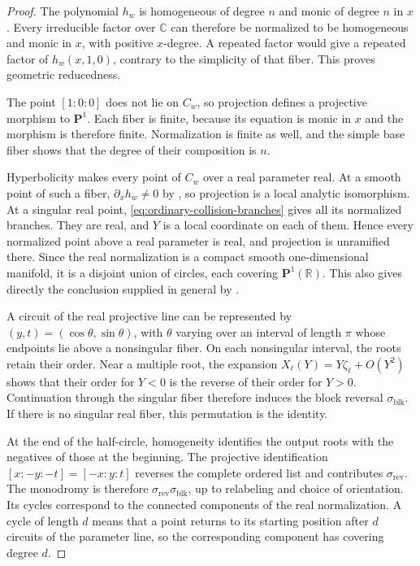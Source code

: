 \documentclass[12pt,reqno]{amsart}
\theoremstyle{definition}
\theoremstyle{remark}
\newcommand{\R}{\mathbb R}
\newcommand{\C}{\mathbb C}
\begin{document}
\begin{proof}
The polynomial \(h_w\) is homogeneous of degree \(n\) and monic of
degree \(n\) in \(x\).  Every irreducible factor over \(\C\) can
therefore be normalized to be homogeneous and monic in \(x\), with
positive \(x\)-degree.  A repeated factor would give a repeated factor
of \(h_w(x,1,0)\), contrary to the simplicity of that fiber.  This
proves geometric reducedness.

The point \([1:0:0]\) does not lie on \(C_w\), so projection defines a projective morphism to \(\mathbf P^1\).  Each fiber is finite, because its equation is monic in \(x\) and the morphism is therefore finite. Normalization is finite as well, and the simple base fiber
shows that the degree of their composition is \(n\).

Hyperbolicity makes every point of \(C_w\) over a real parameter
real.  At a smooth point of such a fiber, \(\partial_xh_w\ne0\) by
,
so projection is a local analytic isomorphism.  At a singular real
point, \eqref{eq:ordinary-collision-branches} gives all its normalized
branches.  They are real, and \(Y\) is a local coordinate on each of
them.  Hence every normalized point above a real parameter is real,
and projection is unramified there.  Since the real normalization is
a compact smooth one-dimensional manifold, it is a disjoint union of
circles, each covering \(\mathbf P^1(\R)\).  This also gives directly
the conclusion supplied in general by \cite[Theorem~2.19]{KummerShamovich20}.

A circuit of the real projective line can be represented by \((y,t)=(\cos\theta,\sin\theta)\), with \(\theta\) varying over an interval of length \(\pi\) whose endpoints lie above a nonsingular fiber. On each nonsingular interval, the roots retain their order. Near a multiple root, the expansion
\(X_\ell(Y)=Y\zeta_\ell+O(Y^2)\) shows that their order for \(Y<0\)
is the reverse of their order for \(Y>0\). Continuation through the singular fiber therefore induces the block reversal \(\sigma_{\mathrm{blk}}\). If there is no singular real fiber, this permutation is the identity.

At the end of the half-circle, homogeneity identifies the output
roots with the negatives of those at the beginning. The projective
identification \([x:-y:-t]=[-x:y:t]\) reverses the complete ordered
list and contributes \(\sigma_{\mathrm{rev}}\). The monodromy is
therefore \(\sigma_{\mathrm{rev}}\sigma_{\mathrm{blk}}\), up to
relabeling and choice of orientation. Its cycles correspond to the
connected components of the real normalization. A cycle of length
\(d\) means that a point returns to its starting position after
\(d\) circuits of the parameter line, so the corresponding component
has covering degree \(d\).


\end{proof}
\end{document}
